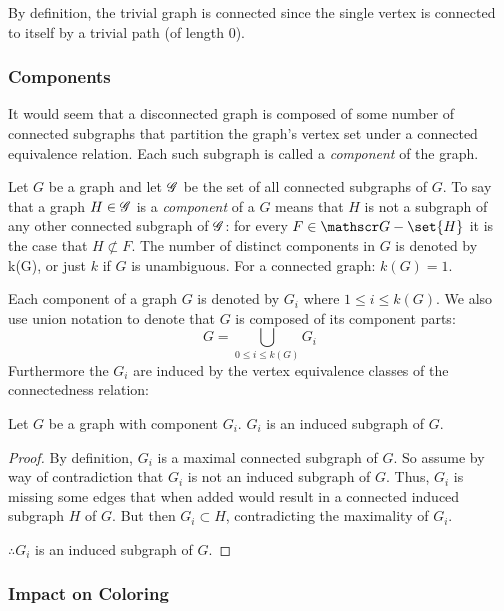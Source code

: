 By definition, the trivial graph is connected since the single vertex is connected to itself by a trivial path (of
length \(0\)).

\subsubsection{Components}

It would seem that a disconnected graph is composed of some number of connected subgraphs that partition the
graph's vertex set under a connected equivalence relation.  Each such subgraph is called a \emph{component} of the
graph.

Let \(G\) be a graph and let \(\mathscr{G}\) be the set of all connected subgraphs of \(G\).  To say that a graph
\(H\in\mathscr{G}\) is a \emph{component} of a \(G\) means that \(H\) is not a subgraph of any other connected subgraph of
\(\mathscr{G}\): for every \(F\in\SG-\set{H}\) it is the case that \(H\not\subset F\).  The number of distinct components
in \(G\) is denoted by k(G), or just \(k\) if \(G\) is unambiguous.  For a connected graph: \(k(G)=1\).

Each component of a graph \(G\) is denoted by \(G_i\) where \(1\le i\le k(G)\).  We also use union notation to
denote that \(G\) is composed of its component parts:
\[G=\bigcup_{0\le i\le k(G)}G_i\]
Furthermore the \(G_i\) are induced by the vertex equivalence classes of the connectedness relation:

\begin{theorem}
  Let \(G\) be a graph with component \(G_i\).  \(G_i\) is an induced subgraph of \(G\).
\end{theorem}

\begin{proof}
  By definition, \(G_i\) is a maximal connected subgraph of \(G\).  So assume by way of contradiction that
  \(G_i\) is not an induced subgraph of \(G\).  Thus, \(G_i\) is missing some edges that when added would result in a
  connected induced subgraph \(H\) of \(G\).  But then \(G_i\subset H\), contradicting the maximality of \(G_i\).

  \(\therefore G_i\) is an induced subgraph of \(G\).
\end{proof}

\subsubsection{Impact on Coloring}

